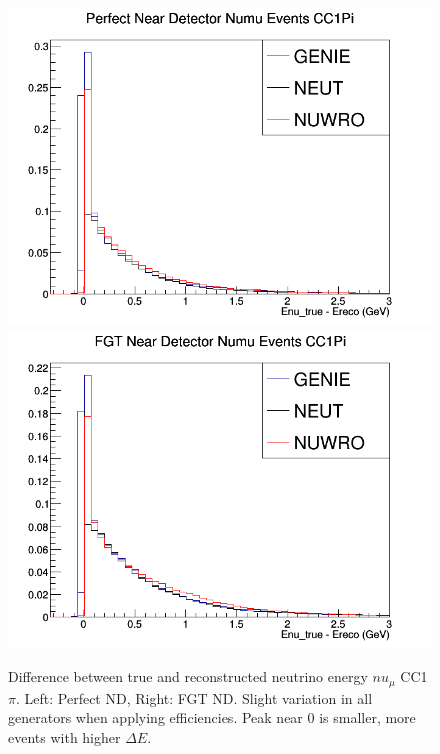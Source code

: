 \documentclass[12pt]{article}
\begin{document}
\begin{figure}[h]
\centering
{}
\includegraphics[width=\linewidth]{Ereco_Etrue/numu_perfect_ND_CC1Pi.png}
\endminipage
{}
\includegraphics[width=\linewidth]{Ereco_Etrue/numu_FGT_CC1Pi.png}
\endminipage
\caption{Difference between true and reconstructed neutrino energy $nu_\mu$ CC1$\pi$. Left: Perfect ND, Right: FGT ND. Slight variation in all generators when applying efficiencies. Peak near 0 is smaller, more events with higher $\Delta E$.}
\label{fig:numu_Etrue_ereco_perfect_FGT_CC1Pi}
\end{figure}
\end{document}

